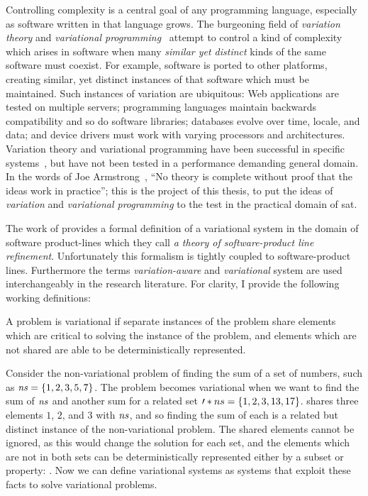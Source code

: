 \label{chapter:introduction}%
%
Controlling complexity is a central goal of any programming language, especially
as software written in that language grows. The burgeoning field of
\emph{variation theory} and \emph{variational
  programming}~\cite{EW11gttse,EW11tosem,HW16fosd,CEW16ecoop,Walk14onward}
attempt to control a kind of complexity which arises in software when many
\emph{similar yet distinct} kinds of the same software must coexist. For
example, software is ported to other platforms, creating similar, yet distinct
instances of that software which must be maintained. Such instances of variation
are ubiquitous: Web applications are tested on multiple servers; programming
languages maintain backwards compatibility and so do software libraries;
databases evolve over time, locale, and data; and device drivers must work with
varying processors and architectures. Variation theory and variational
programming have been successful in specific
systems~\cite{ES18diagrams,SE17fosd,MMWWK17vamos}, but have not been tested in a
performance demanding general domain. In the words of Joe
Armstrong~\cite{armstrongThesis}, ``No theory is complete without proof that the
ideas work in practice''; this is the project of this thesis, to put the ideas
of \emph{variation} and \emph{variational programming} to the test in the
practical domain of \acl{sat}.

The work of \citet{SPLRefinementThoery} provides a formal definition of a
variational system in the domain of software product-lines which they call
\emph{a theory of software-product line refinement}. Unfortunately this
formalism is tightly coupled to software-product lines. Furthermore the terms
\emph{variation-aware} and \emph{variational} system are used interchangeably in
the research literature. For clarity, I provide the following working
definitions:

\begin{definition}
  A problem is variational if separate instances of the problem share elements
  which are critical to solving the instance of the problem, and elements which
  are not shared are able to be deterministically represented.
\end{definition}
%
Consider the non-variational problem of finding the sum of a set of numbers,
such as $\kf{ns} = \set{1,2,3,5,7}$. The problem becomes variational when we
want to find the sum of $\mathit{ns}$ and another sum for a related set $\prime*{ns}
= \set{1,2,3,13,17}$.  shares three elements $1$, $2$, and $3$ with
$\mathit{ns}$, and so finding the sum of each is a related but distinct instance of
the non-variational problem. The shared elements cannot be ignored, as this
would change the solution for each set, and the elements which are not in both
sets can be deterministically represented either by a subset or property:
.
%
Now we can define variational systems as systems that exploit these facts to
solve variational problems.

